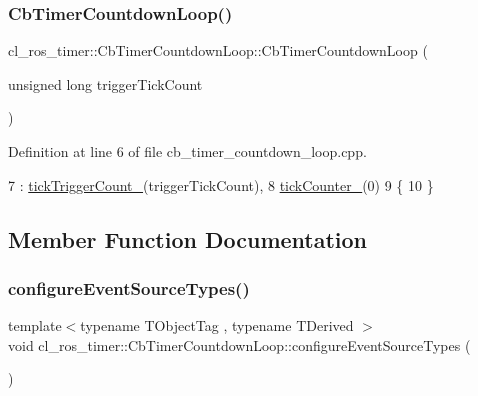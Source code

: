 \subsubsection{\texorpdfstring{Cb\+Timer\+Countdown\+Loop()}{CbTimerCountdownLoop()}}
{\footnotesize\ttfamily cl\+\_\+ros\+\_\+timer\+::\+Cb\+Timer\+Countdown\+Loop\+::\+Cb\+Timer\+Countdown\+Loop (\begin{DoxyParamCaption}\item[{unsigned long}]{trigger\+Tick\+Count }\end{DoxyParamCaption})}



Definition at line 6 of file cb\+\_\+timer\+\_\+countdown\+\_\+loop.\+cpp.


\begin{DoxyCode}
7     : \hyperlink{classcl__ros__timer_1_1CbTimerCountdownLoop_af377585c3d4499a4eec4668549181ae1}{tickTriggerCount\_}(triggerTickCount),
8       \hyperlink{classcl__ros__timer_1_1CbTimerCountdownLoop_a2b2d192bae0da3d26c6e3011583f9a6a}{tickCounter\_}(0)
9 \{
10 \}
\end{DoxyCode}


\subsection{Member Function Documentation}
\mbox{\label{classcl__ros__timer_1_1CbTimerCountdownLoop_a8672075f8a3cbf4ef3f50af0eed8fa53}} 
\subsubsection{\texorpdfstring{configure\+Event\+Source\+Types()}{configureEventSourceTypes()}}
{\footnotesize\ttfamily template$<$typename T\+Object\+Tag , typename T\+Derived $>$ \\
void cl\+\_\+ros\+\_\+timer\+::\+Cb\+Timer\+Countdown\+Loop\+::configure\+Event\+Source\+Types (\begin{DoxyParamCaption}{ }\end{DoxyParamCaption})\hspace{0.3cm}{\ttfamily [inline]}}



